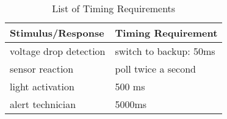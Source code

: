\documentclass[10pt,a4paper,titlepage,draft]{scrartcl} %
\begin{document}
\begin{table}[htbp]
\begin{tabular}{|p{4cm}|p{7.2cm}|}
\hline %
\rowcolor{gray} Stimulus/Response & Timing Requirement \\
\hline %
voltage drop detection & switch to backup: 50ms \\
\hline %
sensor reaction & poll twice a second \\
\hline %
light activation & 500 ms \\
\hline %
alert technician & 5000ms \\
\hline %
\end{tabular}
\caption{List of Timing Requirements}
\label{tab:radTime}
\end{table}


%
\end{document}
